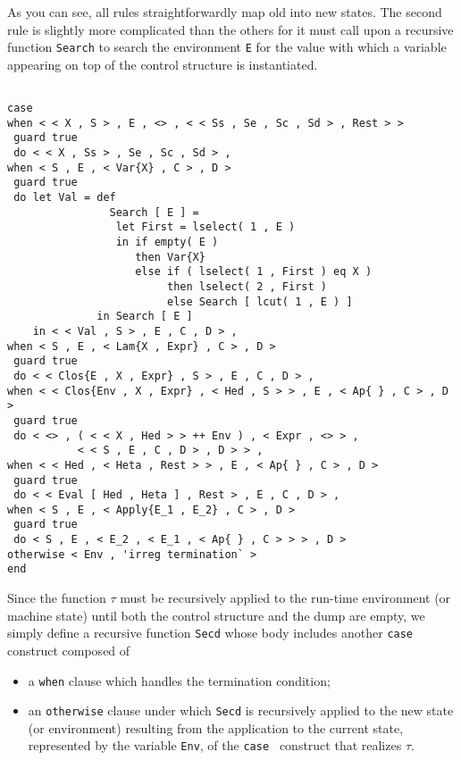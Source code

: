 As you can see, all rules straightforwardly
map old into new states. The second rule is slightly
more complicated than the others for it must call upon a recursive
function {\tt Search} to search the environment {\tt E} for
the value with which a variable appearing on top of the control
structure is instantiated.

\begin{verbatim}

case 
when < < X , S > , E , <> , < < Ss , Se , Sc , Sd > , Rest > >
 guard true
 do < < X , Ss > , Se , Sc , Sd > ,
when < S , E , < Var{X} , C > , D >
 guard true
 do let Val = def 
                Search [ E ] =
                 let First = lselect( 1 , E )
                 in if empty( E )
                    then Var{X}
                    else if ( lselect( 1 , First ) eq X )
                         then lselect( 2 , First )
                         else Search [ lcut( 1 , E ) ]
              in Search [ E ]
    in < < Val , S > , E , C , D > ,
when < S , E , < Lam{X , Expr} , C > , D >
 guard true
 do < < Clos{E , X , Expr} , S > , E , C , D > ,
when < < Clos{Env , X , Expr} , < Hed , S > > , E , < Ap{ } , C > , D >
 guard true
 do < <> , ( < < X , Hed > > ++ Env ) , < Expr , <> > ,
           < < S , E , C , D > , D > > ,
when < < Hed , < Heta , Rest > > , E , < Ap{ } , C > , D >
 guard true
 do < < Eval [ Hed , Heta ] , Rest > , E , C , D > ,
when < S , E , < Apply{E_1 , E_2} , C > , D >
 guard true
 do < S , E , < E_2 , < E_1 , < Ap{ } , C > > > , D >
otherwise < Env , 'irreg termination` >
end

\end{verbatim}
Since the function $\tau$ must be recursively applied to the
run-time environment
(or machine state) until both the control structure and the dump
 are empty, we simply define a recursive function {\tt Secd} whose
body includes another {\tt case} construct composed of
\begin{itemize}
\item a {\tt when} clause which handles the termination condition;
\item an {\tt otherwise} clause under which {\tt Secd} is recursively
applied to the new state (or environment) resulting from the
 application to the current state, represented by the variable {\tt Env}, of the {\tt case } construct that realizes $\tau$.
\end{itemize}
 
